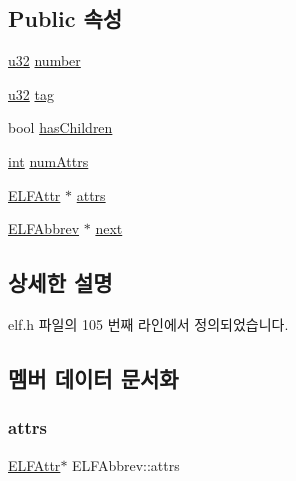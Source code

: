 \subsection*{Public 속성}
\begin{DoxyCompactItemize}
\item 
\mbox{\hyperlink{_system_8h_a10e94b422ef0c20dcdec20d31a1f5049}{u32}} \mbox{\hyperlink{struct_e_l_f_abbrev_a6b68af30db320e5db907501097c3b329}{number}}
\item 
\mbox{\hyperlink{_system_8h_a10e94b422ef0c20dcdec20d31a1f5049}{u32}} \mbox{\hyperlink{struct_e_l_f_abbrev_a0f670bcd5edab3ceab501595357d4c01}{tag}}
\item 
bool \mbox{\hyperlink{struct_e_l_f_abbrev_ad82152aad0444c5b98f5194bd0dfbc15}{has\+Children}}
\item 
\mbox{\hyperlink{_util_8cpp_a0ef32aa8672df19503a49fab2d0c8071}{int}} \mbox{\hyperlink{struct_e_l_f_abbrev_a5604c4d3d6d4e3beaf6cbbe7bdf8bd66}{num\+Attrs}}
\item 
\mbox{\hyperlink{struct_e_l_f_attr}{E\+L\+F\+Attr}} $\ast$ \mbox{\hyperlink{struct_e_l_f_abbrev_afc84e5b441529cc88fce41021fc0839c}{attrs}}
\item 
\mbox{\hyperlink{struct_e_l_f_abbrev}{E\+L\+F\+Abbrev}} $\ast$ \mbox{\hyperlink{struct_e_l_f_abbrev_a95ecd80ddef4fe77a44c0762725c06dc}{next}}
\end{DoxyCompactItemize}


\subsection{상세한 설명}


elf.\+h 파일의 105 번째 라인에서 정의되었습니다.



\subsection{멤버 데이터 문서화}
\mbox{\label{struct_e_l_f_abbrev_afc84e5b441529cc88fce41021fc0839c}} 
\subsubsection{\texorpdfstring{attrs}{attrs}}
{\footnotesize\ttfamily \mbox{\hyperlink{struct_e_l_f_attr}{E\+L\+F\+Attr}}$\ast$ E\+L\+F\+Abbrev\+::attrs}



